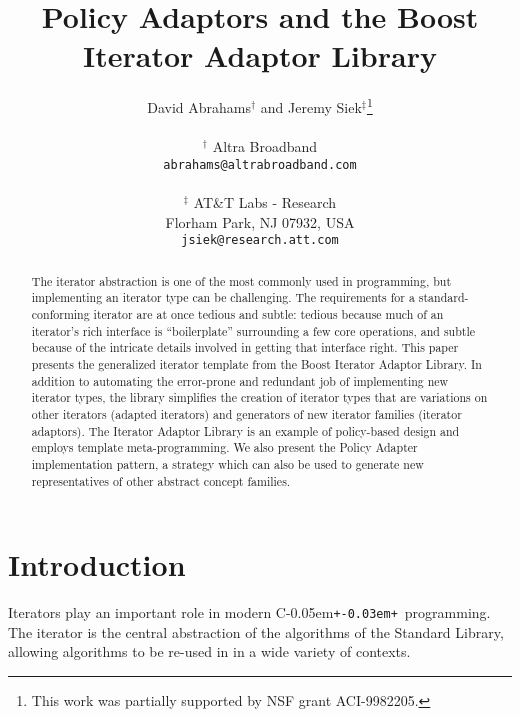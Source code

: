\documentclass{netobjectdays}
\newcommand{\Cpp}{C\kern-0.05em\texttt{+\kern-0.03em+}}
\begin{document}
\title{Policy Adaptors and the Boost Iterator Adaptor Library}

\author{David Abrahams$^\dag$ and Jeremy Siek$^\ddag$\thanks{This work
was partially supported by NSF grant ACI-9982205.} \\
\\
$^\dag$ Altra Broadband \\
\texttt{abrahams@altrabroadband.com}\\
\\
$^\ddag$ AT\&T Labs - Research \\
Florham Park, NJ 07932, USA \\
\texttt{jsiek@research.att.com}
}

\maketitle

 \begin{abstract} $\!$The iterator abstraction is one of the most
commonly used in programming, but implementing an iterator type can be
challenging. The requirements for a standard-conforming iterator are
at once tedious and subtle: tedious because much of an iterator's rich
interface is ``boilerplate'' surrounding a few core operations, and
subtle because of the intricate details involved in getting that
interface right. This paper presents the generalized iterator template
from the Boost Iterator Adaptor Library. In addition to automating the
error-prone and redundant job of implementing new iterator types, the
library simplifies the creation of iterator types that are variations
on other iterators (adapted iterators) and generators of new iterator
families (iterator adaptors). The Iterator Adaptor Library is an
example of policy-based design and employs template
meta-programming. We also present the Policy Adapter implementation
pattern, a strategy which can also be used to generate new
representatives of other abstract concept families.
\end{abstract}


\section{Introduction}


Iterators play an important role in modern \Cpp\ programming. The
iterator is the central abstraction of the algorithms of the Standard
Library, allowing algorithms to be re-used in in a wide variety of
contexts. 
\end{document}
